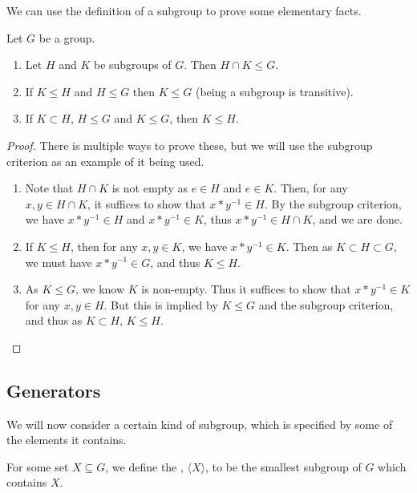 \documentclass[a4]{scrreprt}
\begin{document}
We can use the definition of a subgroup to prove some elementary facts.
\begin{proposition}
	Let $G$ be a group.
	\begin{enumerate}[label=(\roman*)]
		\item Let $H$ and $K$ be subgroups of $G$. Then $H \cap K \leq G$.
		\item If $K \leq H$ and $H \leq G$ then $K \leq G$ (being a subgroup is transitive).
		\item If $K \subset H$, $H \leq G$ and $K \leq G$, then $K \leq H$. 
	\end{enumerate}
\end{proposition}
\begin{proof} There is multiple ways to prove these, but we will use the subgroup criterion as an example of it being used.\phantom{\qedhere}
	\begin{enumerate}[label=(\roman*)]
		\item Note that $H \cap K$ is not empty as $e \in H$ and $e \in K$. Then, for any $x, y \in H \cap K$, it suffices to show that $x * y^{-1} \in H$. By the subgroup criterion, we have $x * y^{-1} \in H$ and $x*y^{-1} \in K$, thus $x * y^{-1} \in H \cap K$, and we are done.
		\item If $K \leq H$, then for any $x, y \in K$, we have $x * y^{-1} \in K$. Then as $K \subset H \subset G$, we must have $x * y^{-1} \in G$, and thus $K \leq H$.
		\item As $K \leq G$, we know $K$ is non-empty. Thus it suffices to show that $x * y^{-1} \in K$ for any $x, y \in H$. But this is implied by $K \leq G$ and the subgroup criterion, and thus as $K \subset H$, $K \leq H$. \hfill \qedsymbol
	\end{enumerate}
\end{proof}

\subsection{Generators}

We will now consider a certain kind of subgroup, which is specified by some of the elements it contains.

\begin{definition}
	For some set $X \subseteq G$, we define the , $\langle X \rangle$, to be the smallest subgroup of $G$ which contains $X$.
\end{definition}
\end{document}
